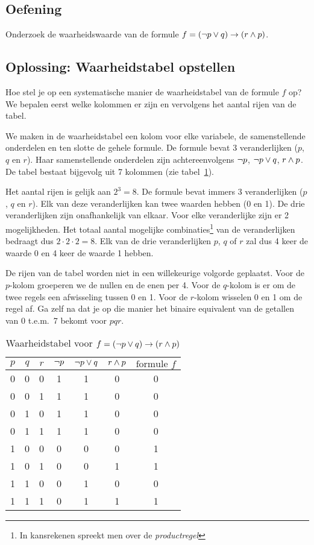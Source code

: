 \subsection{Oefening}
Onderzoek de waarheidswaarde van de formule $f = (\neg p \vee q) \rightarrow (r \wedge p)$.\\

\subsection*{Oplossing: Waarheidstabel opstellen}
Hoe stel je op een systematische manier de waarheidstabel van de formule $f$ op? We bepalen eerst welke kolommen er zijn en vervolgens het aantal rijen van de tabel.

We maken in de waarheidstabel een kolom voor elke variabele, de samenstellende onderdelen en ten slotte de gehele formule. De formule bevat 3 veranderlijken ($p$, $q$ en $r$). Haar samenstellende onderdelen zijn achtereenvolgens $\neg p$, $\neg p \vee q$, $r \wedge p$. De tabel bestaat bijgevolg uit 7 kolommen (zie tabel~\ref{tbl:oefdrievar}).

Het aantal rijen is gelijk aan $2^3=8$.  De formule bevat immers 3 veranderlijken ($p$, $q$ en $r$). Elk van deze veranderlijken kan twee waarden hebben (0 en 1). De drie veranderlijken zijn onafhankelijk van elkaar. Voor elke veranderlijke zijn er 2 mogelijkheden. Het totaal aantal mogelijke combinaties\footnote{In kansrekenen spreekt men over de \emph{productregel}} van de veranderlijken bedraagt dus $2 \cdot 2 \cdot 2 = 8$. Elk van de drie veranderlijken $p$, $q$ of $r$ zal dus 4 keer de waarde 0 en 4 keer de waarde 1 hebben.

De rijen van de tabel worden niet in een willekeurige volgorde geplaatst. Voor de $p$-kolom groeperen we de nullen en de enen per 4. Voor de $q$-kolom is er om de twee regels een afwisseling tussen 0 en 1. Voor de $r$-kolom wisselen 0 en 1 om de regel af. Ga zelf na dat je op die manier het binaire equivalent van de getallen van 0 t.e.m.\ 7 bekomt voor $pqr$.
\begin{table}[htb]
  \centering
  \caption{Waarheidstabel voor $f=(\neg p \vee q) \rightarrow (r \wedge p)$}\label{tbl:oefdrievar}
\begin{tabular}{ccccccc}
\toprule
 $p$  & $q$ & $r$ & $\neg p$ & $\neg p \vee q$ & $r \wedge p$ & $\mbox{formule } f$ \\
\midrule
0 & 0 & 0 & 1 & 1 & 0 & 0 \\
0 & 0 & 1 & 1 & 1 & 0 & 0 \\
0 & 1 & 0 & 1 & 1 & 0 & 0 \\
0 & 1 & 1 & 1 & 1 & 0 & 0 \\
1 & 0 & 0 & 0 & 0 & 0 & 1 \\
1 & 0 & 1 & 0 & 0 & 1 & 1 \\
1 & 1 & 0 & 0 & 1 & 0 & 0 \\
1 & 1 & 1 & 0 & 1 & 1 & 1 \\
\bottomrule
\end{tabular}
\end{table}

